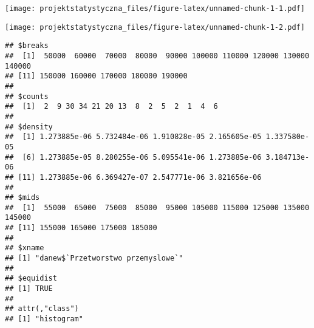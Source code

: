 \documentclass[
]{article}
\newenvironment{Shaded}{\begin{snugshade}}{\end{snugshade}}
\newcommand{\AttributeTok}[1]{\textcolor[rgb]{0.77,0.63,0.00}{#1}}
\newcommand{\DecValTok}[1]{\textcolor[rgb]{0.00,0.00,0.81}{#1}}
\newcommand{\DocumentationTok}[1]{\textcolor[rgb]{0.56,0.35,0.01}{\textbf{\textit{#1}}}}
\newcommand{\FunctionTok}[1]{\textcolor[rgb]{0.00,0.00,0.00}{#1}}
\newcommand{\NormalTok}[1]{#1}
\newcommand{\OtherTok}[1]{\textcolor[rgb]{0.56,0.35,0.01}{#1}}
\newcommand{\SpecialCharTok}[1]{\textcolor[rgb]{0.00,0.00,0.00}{#1}}
\newcommand{\StringTok}[1]{\textcolor[rgb]{0.31,0.60,0.02}{#1}}
\begin{document}
\begin{Shaded}
\end{Shaded}

\texttt{[image: projektstatystyczna\_files/figure-latex/unnamed-chunk-1-1.pdf]}

\begin{Shaded}
\end{Shaded}

\texttt{[image: projektstatystyczna\_files/figure-latex/unnamed-chunk-1-2.pdf]}

\begin{verbatim}
## $breaks
##  [1]  50000  60000  70000  80000  90000 100000 110000 120000 130000 140000
## [11] 150000 160000 170000 180000 190000
## 
## $counts
##  [1]  2  9 30 34 21 20 13  8  2  5  2  1  4  6
## 
## $density
##  [1] 1.273885e-06 5.732484e-06 1.910828e-05 2.165605e-05 1.337580e-05
##  [6] 1.273885e-05 8.280255e-06 5.095541e-06 1.273885e-06 3.184713e-06
## [11] 1.273885e-06 6.369427e-07 2.547771e-06 3.821656e-06
## 
## $mids
##  [1]  55000  65000  75000  85000  95000 105000 115000 125000 135000 145000
## [11] 155000 165000 175000 185000
## 
## $xname
## [1] "danew$`Przetworstwo przemyslowe`"
## 
## $equidist
## [1] TRUE
## 
## attr(,"class")
## [1] "histogram"
\end{verbatim}

\begin{Shaded}
\end{Shaded}
\end{document}
